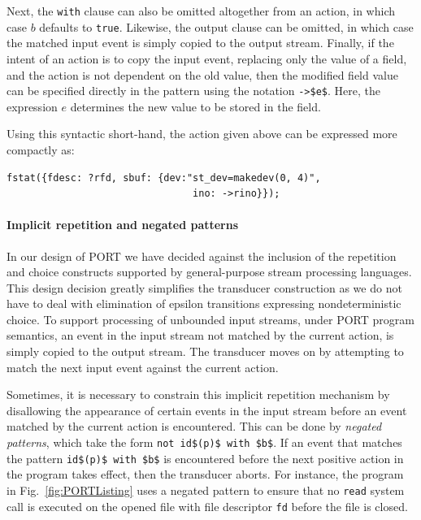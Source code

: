 Next, the \lstinline+with+ clause can also be omitted altogether from an action, in which case $b$ defaults to \lstinline+true+. Likewise, the output clause can be omitted, in which case the matched input event is simply copied to the output stream. Finally, if the intent of an action is to copy the input event, replacing only the value of a field, and the action is not dependent on the old value, then the modified field value can be specified directly in the pattern using the notation \lstinline+->$e$+. Here, the expression $e$ determines the new value to be stored in the field.

Using this syntactic short-hand, the action given above can be expressed more compactly as:
\begin{lstlisting}[numbers=none,xleftmargin=0em,gobble=2]
  fstat({fdesc: ?rfd, sbuf: {dev:"st_dev=makedev(0, 4)",
                                ino: ->rino}});
\end{lstlisting}


\paragraph*{Implicit repetition and negated patterns}
In our design of PORT we have decided against the inclusion of the repetition and choice constructs supported by general-purpose stream processing languages. This design decision greatly simplifies the transducer construction as we do not have to deal with elimination of epsilon transitions expressing nondeterministic choice. To support processing of unbounded input streams, under PORT program semantics, an event in the input stream not matched by the current action, is simply copied to the output stream. The transducer moves on by attempting to match the next input event against the current action.

Sometimes, it is necessary to constrain this implicit repetition mechanism by disallowing the appearance of certain events in the input stream before an event  matched by the current action is encountered.  This can be done by \emph{negated patterns}, which take the form \lstinline+not id$(p)$ with $b$+. If an event that matches the pattern \lstinline+id$(p)$ with $b$+ is encountered before the next positive action in the program takes effect, then the transducer aborts. For instance, the program in Fig.~\ref{fig:PORTListing} uses a negated pattern to ensure that no \lstinline+read+ system call is executed on the opened file with file descriptor \lstinline+fd+ before the file is closed.

